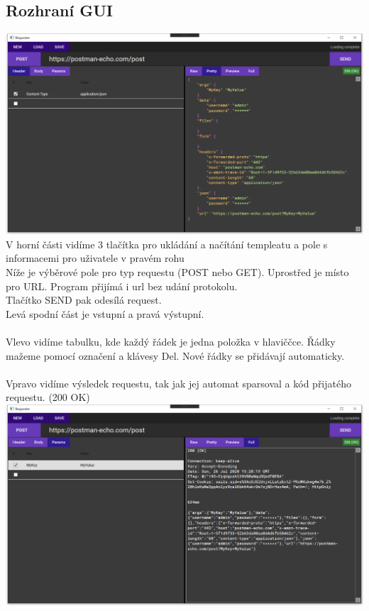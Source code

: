 \documentclass[a4paper]{article}
\begin{document}
    \subsection{Rozhraní GUI}
        \includegraphics[width=\textwidth]{mainPage.PNG}
        V horní části vidíme 3 tlačítka pro ukládání a načítání templeatu a
        pole s informacemi pro uživatele v pravém rohu\\
        Níže je výběrové pole pro typ requestu (POST nebo GET).
        Uprostřed je místo pro URL. Program přijímá i url bez udání protokolu.\\
        Tlačítko SEND pak odesílá request.\\
        Levá spodní část je vstupní a pravá výstupní.\\
        \\
        Vlevo vidíme tabulku, kde každý řádek je jedna položka v hlaviččce.
        Řádky mažeme pomocí označení a klávesy Del. Nové řádky se
        přidávají automaticky.\\
        \\
        Vpravo vidíme výsledek requestu, tak jak jej automat sparsoval a
        kód přijatého requestu. (200 OK)\\
        \includegraphics[width=\textwidth]{thirdPage.PNG}
\end{document}
